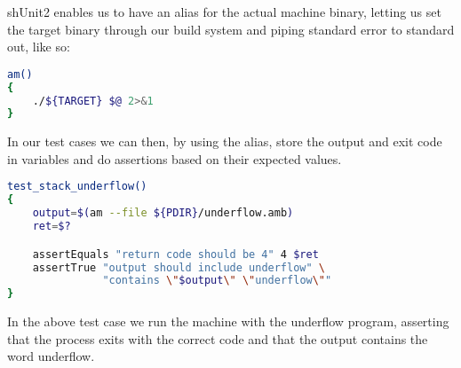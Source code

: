 shUnit2 enables us to have an alias for the actual machine binary, letting us
set the target binary through our build system and piping standard error to
standard out, like so:
\begin{lstlisting}[language={sh},caption={Machine binary alias}]
am()
{
    ./${TARGET} $@ 2>&1
}
\end{lstlisting}

In our test cases we can then, by using the alias, store the output and exit
code in variables and do assertions based on their expected values.
\begin{lstlisting}[language={sh},caption={shUnit2 underflow test case}]
test_stack_underflow()
{
    output=$(am --file ${PDIR}/underflow.amb)
    ret=$?

    assertEquals "return code should be 4" 4 $ret
    assertTrue "output should include underflow" \
               "contains \"$output\" \"underflow\""
}
\end{lstlisting}

In the above test case we run the machine with the underflow program, asserting
that the process exits with the correct code and that the output contains the
word underflow.
